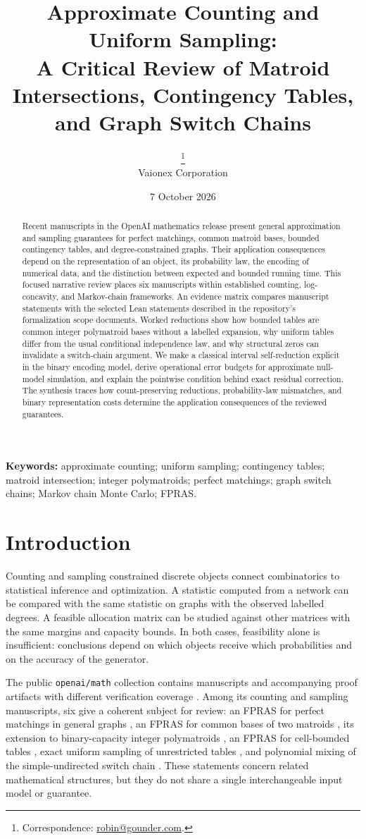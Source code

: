 \documentclass[11pt]{article}
\title{Approximate Counting and Uniform Sampling:\\
A Critical Review of Matroid Intersections, Contingency Tables, and Graph Switch Chains}
\author{\AuthorNames\thanks{Correspondence: \href{mailto:robin@gounder.com}{robin@gounder.com}.}\\{\small Vaionex Corporation}}
\date{7 October 2026}
\begin{document}
\maketitle
\begin{abstract}
Recent manuscripts in the OpenAI mathematics release present general approximation and sampling guarantees for perfect matchings, common matroid bases, bounded contingency tables, and degree-constrained graphs. Their application consequences depend on the representation of an object, its probability law, the encoding of numerical data, and the distinction between expected and bounded running time. This focused narrative review places six manuscripts within established counting, log-concavity, and Markov-chain frameworks. An evidence matrix compares manuscript statements with the selected Lean statements described in the repository's formalization scope documents. Worked reductions show how bounded tables are common integer polymatroid bases without a labelled expansion, why uniform tables differ from the usual conditional independence law, and why structural zeros can invalidate a switch-chain argument. We make a classical interval self-reduction explicit in the binary encoding model, derive operational error budgets for approximate null-model simulation, and explain the pointwise condition behind exact residual correction. The synthesis traces how count-preserving reductions, probability-law mismatches, and binary representation costs determine the application consequences of the reviewed guarantees.
\end{abstract}
\noindent\textbf{Keywords:} approximate counting; uniform sampling; contingency tables;
matroid intersection; integer polymatroids; perfect matchings; graph switch chains;
Markov chain Monte Carlo; FPRAS.

\section{Introduction}
Counting and sampling constrained discrete objects connect combinatorics to statistical inference and optimization. A statistic computed from a network can be compared with the same statistic on graphs with the observed labelled degrees. A feasible allocation matrix can be studied against other matrices with the same margins and capacity bounds. In both cases, feasibility alone is insufficient: conclusions depend on which objects receive which probabilities and on the accuracy of the generator.

The public \texttt{openai/math} collection contains manuscripts and accompanying proof artifacts with different verification coverage \cite{release}. Among its counting and sampling manuscripts, six give a coherent subject for review: an FPRAS for perfect matchings in general graphs \cite{oaiMatching}, an FPRAS for common bases of two matroids \cite{oaiBases}, its extension to binary-capacity integer polymatroids \cite{oaiPolymatroids}, an FPRAS for cell-bounded tables \cite{oaiBoundedTables}, exact uniform sampling of unrestricted tables \cite{oaiTables}, and polynomial mixing of the simple-undirected switch chain \cite{oaiSwitch}. These statements concern related mathematical structures, but they do not share a single interchangeable input model or guarantee.
\end{document}
